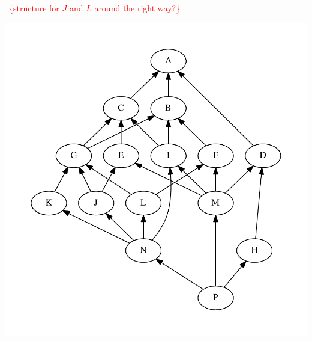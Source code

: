 \documentclass[11pt,oneside]{article}
\newcommand{\todo}[1]{\ \textcolor{red}{\{#1\}}\ }
\begin{document}
\todo{structure for $J$ and $L$ around the right way?}

\begin{center}
\includegraphics[width=0.6\columnwidth]{subgroups_gl32.pdf} 
\end{center}
\end{document}
